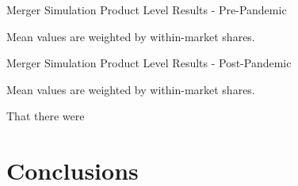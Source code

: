 \documentclass{article}
\begin{document}
    \begin{table}
        \caption{Merger Simulation Product Level Results - Pre-Pandemic}
        \label{tab:Simulation_Pre}
        \begin{center} 
        \end{center}
        Mean values are weighted by within-market shares. 
    \end{table}

    \begin{table}
        \caption{Merger Simulation Product Level Results - Post-Pandemic}
        \label{tab:Simulation_Post}
        \begin{center}
         
        \end{center}
        Mean values are weighted by within-market shares. 
     \end{table}

    That there were 
    
	\section{Conclusions}
	\label{sec:Conclusion}
	
	\pagebreak 
	 
	
	\FloatBarrier
	
\end{document}

